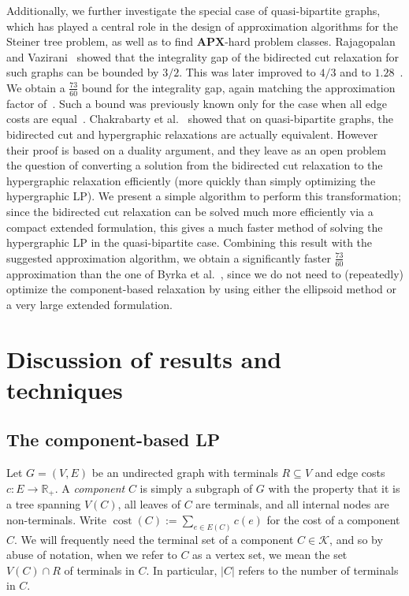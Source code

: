 \documentclass[11pt, letterpaper]{article}
\theoremstyle{definition}
\DeclareMathOperator{\cost}{cost}
\newcommand{\cc}[1]{c(#1)}
\newcommand{\comp}{\mathcal{K}}
\newcommand{\card}[1]{\lvert#1\rvert}
\begin{document}
Additionally, we further investigate the special case
of quasi-bipartite graphs, which has played a central
role in the design of approximation algorithms for the
Steiner tree problem, as well as to find $\mathbf{APX}$-hard
problem classes.
Rajagopalan and Vazirani~\cite{RV99} showed that the integrality gap
of the bidirected cut relaxation for such graphs can be bounded by $3/2$.
This was later improved to $4/3$ \cite{CDV08} and to $1.28$~\cite{chakrabarty_2010_integralitygap}.
We obtain a $\frac{73}{60}$ bound for the integrality gap, again matching the approximation factor of~\cite{byrka_2011_steiner}.
Such a bound was previously known only for the case when all edge costs are equal~\cite{chakrabarty_2010_integralitygap}.
Chakrabarty et al.~\cite{chakrabarty_2010_hypergraphic} showed that on quasi-bipartite graphs, the bidirected cut and hypergraphic relaxations are actually equivalent. 
 However their proof is based on a duality argument, and they leave as an open problem the question of converting a solution from the bidirected cut relaxation to the hypergraphic relaxation efficiently (more quickly than simply optimizing the hypergraphic LP).
We present a simple algorithm to perform this transformation; since the bidirected cut relaxation can be solved much more efficiently via a compact extended formulation, this gives a much faster method of solving the hypergraphic LP in the quasi-bipartite case.
Combining this result with the suggested approximation
algorithm, we obtain a significantly faster
$\frac{73}{60}$ approximation than
the one of Byrka et al.~\cite{byrka_2011_steiner},
since we do not need to (repeatedly) optimize the component-based
relaxation by using either the ellipsoid method or a
very large extended formulation.






\section{Discussion of results and techniques}\label{sec:overview}

\subsection{The component-based LP}

Let $G=(V,E)$ be an undirected graph with terminals $R\subseteq V$
and edge costs $c : E \to \mathbb{R}_+$.
A \emph{component} $C$ is simply a subgraph of $G$ with the property that it is a tree spanning $V(C)$, all leaves of $C$ are terminals, and all internal nodes are
non-terminals.
Write $\cost(C) := \sum_{e \in E(C)} \cc{e}$ for the cost of a component $C$.
We will frequently need the terminal set of a component $C \in \comp$, and so by abuse of notation, when we refer to $C$ as a vertex set, we mean the set $V(C)\cap R$ of terminals in $C$. In particular, $\card{C}$ refers to the number of terminals in $C$.
\end{document}
